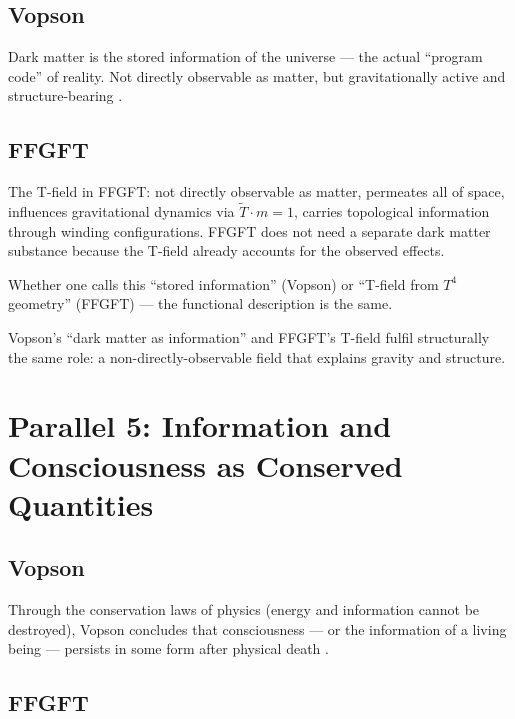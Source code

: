 \subsection{Vopson}

Dark matter is the stored information of the universe --- the actual
``program code'' of reality. Not directly observable as matter, but
gravitationally active and structure-bearing \cite{Vopson2024}.

\subsection{FFGFT}

The T-field in FFGFT: not directly observable as matter, permeates all of
space, influences gravitational dynamics via $\tilde{T} \cdot m = 1$, carries
topological information through winding configurations. FFGFT does not need
a separate dark matter substance because the T-field already accounts for the
observed effects.

Whether one calls this ``stored information'' (Vopson) or ``T-field from
$T^4$ geometry'' (FFGFT) --- the functional description is the same.

\begin{erkenntnis}
Vopson's ``dark matter as information'' and FFGFT's T-field fulfil
structurally the same role: a non-directly-observable field that explains
gravity and structure.
\end{erkenntnis}

\section{Parallel 5: Information and Consciousness as Conserved Quantities}

\subsection{Vopson}

Through the conservation laws of physics (energy and information cannot be
destroyed), Vopson concludes that consciousness --- or the information of a
living being --- persists in some form after physical death \cite{Vopson2024}.

\subsection{FFGFT}

